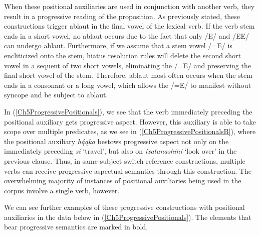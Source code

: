 When these positional auxiliaries are used in conjunction with another verb, they result in a progressive reading of the proposition. As previously stated, these constructions trigger ablaut in the final vowel of the lexical verb. If the verb stem ends in a short vowel, no ablaut occurs due to the fact that only /E/ and /EE/ can undergo ablaut. Furthermore, if we assume that a stem vowel /=E/ is encliticized onto the stem, hiatus resolution rules will delete the second short vowel in a sequent of two short vowels, eliminating the /=E/ and preserving the final short vowel of the stem. Therefore, ablaut most often occurs when the stem ends in a consonant or a long vowel, which allows the /=E/ to manifest without syncope and be subject to ablaut. 

In (\ref{Ch5ProgressivePositionals}), we see that the verb immediately preceding the positional auxiliary gets progressive aspect. However, this auxiliary is able to take scope over multiple predicates, as we see in (\ref{Ch5ProgressivePositionalsB}), where the positional auxiliary \textit{hą́ąka} bestows progressive aspect not only on the immediately preceding \textit{sí} `travel', but also on \textit{íxatanashini} `look over' in the previous clause. Thus, in same-subject switch-reference constructions, multiple verbs can receive progressive aspectual semantics through this construction. The overwhelming majority of instances of positional auxiliaries being used in the corpus involve a single verb, however.

We can see further examples of these progressive constructions with positional auxiliaries in the data below in (\ref{Ch5ProgressivePositionals}). The elements that bear progressive semantics are marked in bold.

